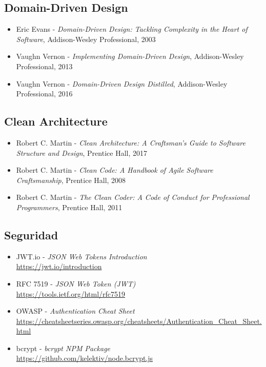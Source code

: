 \documentclass[12pt,a4paper]{article}
\begin{document}
\subsection{Domain-Driven Design}

\begin{itemize}[leftmargin=*]
    \item Eric Evans - \textit{Domain-Driven Design: Tackling Complexity in the Heart of Software}, Addison-Wesley Professional, 2003

    \item Vaughn Vernon - \textit{Implementing Domain-Driven Design}, Addison-Wesley Professional, 2013

    \item Vaughn Vernon - \textit{Domain-Driven Design Distilled}, Addison-Wesley Professional, 2016
\end{itemize}

\subsection{Clean Architecture}

\begin{itemize}[leftmargin=*]
    \item Robert C. Martin - \textit{Clean Architecture: A Craftsman's Guide to Software Structure and Design}, Prentice Hall, 2017

    \item Robert C. Martin - \textit{Clean Code: A Handbook of Agile Software Craftsmanship}, Prentice Hall, 2008

    \item Robert C. Martin - \textit{The Clean Coder: A Code of Conduct for Professional Programmers}, Prentice Hall, 2011
\end{itemize}

\subsection{Seguridad}

\begin{itemize}[leftmargin=*]
    \item JWT.io - \textit{JSON Web Tokens Introduction} \\
    \url{https://jwt.io/introduction}

    \item RFC 7519 - \textit{JSON Web Token (JWT)} \\
    \url{https://tools.ietf.org/html/rfc7519}

    \item OWASP - \textit{Authentication Cheat Sheet} \\
    \url{https://cheatsheetseries.owasp.org/cheatsheets/Authentication_Cheat_Sheet.html}

    \item bcrypt - \textit{bcrypt NPM Package} \\
    \url{https://github.com/kelektiv/node.bcrypt.js}
\end{itemize}
\end{document}
